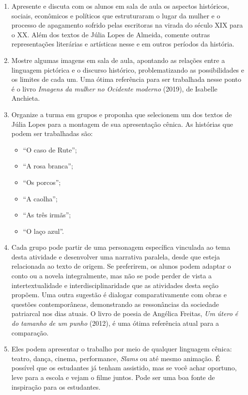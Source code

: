 \documentclass[12pt]{extarticle}
\begin{document}
\begin{enumerate}
\item
Apresente e discuta com os alunos em sala de
aula os aspectos históricos, sociais, econômicos e políticos que
estruturaram o lugar da mulher e o processo de apagamento sofrido pelas
escritoras na virada do século \textsc{XIX} para o \textsc{XX}. Além dos textos de Júlia
Lopes de Almeida, comente outras representações literárias e artísticas
nesse e em outros períodos da história.

\item
Mostre algumas imagens em sala de aula, apontando as relações entre a
linguagem pictórica e o discurso histórico, problematizando as
possibilidades e os limites de cada um. Uma ótima referência para ser
trabalhada nesse ponto é o livro \emph{Imagens da mulher no Ocidente
moderno} (2019), de Isabelle Anchieta.

\item
Organize a turma em grupos e proponha que selecionem um dos textos de
Júlia Lopes para a montagem de sua apresentação cênica. As histórias que
podem ser trabalhadas são:

\begin{itemize}
\item
  ``O caso de Rute'';
\item
  ``A rosa branca'';
\item
  ``Os porcos'';
\item
  ``A caolha'';
\item
  ``As três irmãs'';
\item
  ``O laço azul''.
\end{itemize}

\item
Cada grupo pode partir de uma personagem específica vinculada ao tema
desta atividade e desenvolver uma narrativa paralela, desde que esteja
relacionada ao texto de origem. Se preferirem, os alunos podem adaptar o
conto ou a novela integralmente, mas não se pode perder de vista a
intertextualidade e interdisciplinaridade que as atividades desta seção
propõem. Uma outra sugestão é dialogar comparativamente com obras e
questões contemporâneas, demonstrando as ressonâncias da sociedade
patriarcal nos dias atuais. O livro de poesia de Angélica Freitas,
\emph{Um útero é do tamanho de um punho} (2012), é uma ótima referência
atual para a comparação.

\item
Eles podem apresentar o trabalho por meio de qualquer linguagem
cênica: teatro, dança, cinema, performance, \emph{Slams} ou até mesmo
animação. É possível que os estudantes já tenham assistido, mas se você
achar oportuno, leve para a escola e vejam o filme juntos. Pode ser uma
boa fonte de inspiração para os estudantes.


\end{enumerate}
\end{document}

